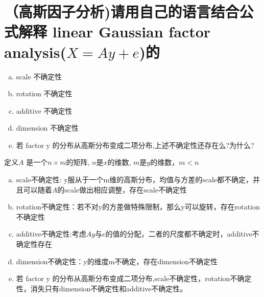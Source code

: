 \documentclass[11pt]{article}
\newenvironment{answer}{\par\color{MidnightBlue}}{\par}
\begin{document}
\section{（高斯因子分析)请用自己的语言结合公式解释 linear	Gaussian factor analysis($X=Ay+e$)的}
\begin{enumerate}[(a)]
    \item scale 不确定性
    \item rotation 不确定性
    \item additive 不确定性
    \item dimension 不确定性
    \item 若 factor y 的分布从高斯分布变成二项分布,上述不确定性还存在么?为什么?
\end{enumerate}
\begin{answer}
定义$A$ 是一个$n \times m$的矩阵, $n$是$x$的维数, $m$是$y$的维数，$m < n$
\begin{enumerate}[(a)]
\item scale不确定性: y服从于一个m维的高斯分布，均值与方差的scale都不确定，并且可以随着$A$的scale做出相应调整，存在scale不确定性
\item rotation不确定性：若不对y的方差做特殊限制，那么y可以旋转，存在rotation不确定性
\item additive不确定性:考虑$Ay$与$e$的值的分配，二者的尺度都不确定时，additive不确定性存在
\item dimension不确定性：y的维度m不确定，存在dimension不确定性
\item 若 factor y 的分布从高斯分布变成二项分布,scale不确定性，rotation不确定性，消失只有dimension不确定性和additive不确定性。
\end{enumerate}
\end{answer}
\end{document}
